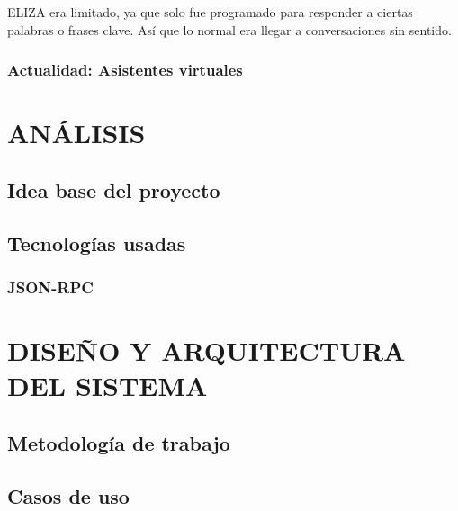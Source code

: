 \documentclass[spanish,12pt, a4paper, twoside]{paper}
\let\oldsection\section
\def\section{\cleardoublepage\oldsection}
\begin{document}
ELIZA era limitado, ya que solo fue programado para responder a ciertas palabras o frases clave. Así que lo normal era llegar a conversaciones sin sentido.


\subsubsection{Actualidad: Asistentes virtuales}

\section{ANÁLISIS}

\subsection{Idea base del proyecto}

\subsection{Tecnologías usadas}

\subsubsection{JSON-RPC}

\section{DISEÑO Y ARQUITECTURA DEL SISTEMA}

\subsection{Metodología de trabajo}

\subsection{Casos de uso}
\end{document}
